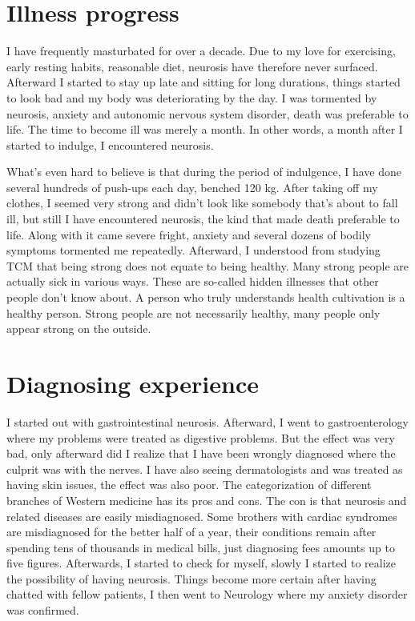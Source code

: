 \documentclass[
]{book}
\begin{document}
\hypertarget{illness-progress}{%
\section{Illness progress}\label{illness-progress}}

I have frequently masturbated for over a decade. Due to my love for exercising, early resting habits, reasonable diet, neurosis have therefore never surfaced. Afterward I started to stay up late and sitting for long durations, things started to look bad and my body was deteriorating by the day. I was tormented by neurosis, anxiety and autonomic nervous system disorder, death was preferable to life. The time to become ill was merely a month. In other words, a month after I started to indulge, I encountered neurosis.

What's even hard to believe is that during the period of indulgence, I have done several hundreds of push-ups each day, benched 120 kg. After taking off my clothes, I seemed very strong and didn't look like somebody that's about to fall ill, but still I have encountered neurosis, the kind that made death preferable to life. Along with it came severe fright, anxiety and several dozens of bodily symptoms tormented me repeatedly. Afterward, I understood from studying TCM that being strong does not equate to being healthy. Many strong people are actually sick in various ways. These are so-called hidden illnesses that other people don't know about. A person who truly understands health cultivation is a healthy person. Strong people are not necessarily healthy, many people only appear strong on the outside.

\hypertarget{diagnosing-experience}{%
\section{Diagnosing experience}\label{diagnosing-experience}}

I started out with gastrointestinal neurosis. Afterward, I went to gastroenterology where my problems were treated as digestive problems. But the effect was very bad, only afterward did I realize that I have been wrongly diagnosed where the culprit was with the nerves. I have also seeing dermatologists and was treated as having skin issues, the effect was also poor. The categorization of different branches of Western medicine has its pros and cons. The con is that neurosis and related diseases are easily misdiagnosed. Some brothers with cardiac syndromes are misdiagnosed for the better half of a year, their conditions remain after spending tens of thousands in medical bills, just diagnosing fees amounts up to five figures. Afterwards, I started to check for myself, slowly I started to realize the possibility of having neurosis. Things become more certain after having chatted with fellow patients, I then went to Neurology where my anxiety disorder was confirmed.
\end{document}

